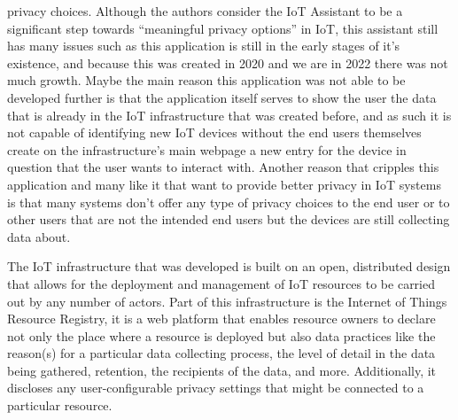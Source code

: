 \documentclass[conference]{IEEEtran}
\begin{document}
privacy choices. Although the authors consider the IoT Assistant to be a significant
step towards ``meaningful privacy options'' in IoT, this assistant still has many
issues such as this application is still in the early stages of it's existence,
and because this was created in 2020 and we are in 2022 there was not much growth.
Maybe the main reason this application was not able to be developed further is
that the application itself serves to show the user the data that is already in
the IoT infrastructure that was created before, and as such it is not capable of
identifying new IoT devices without the end users themselves create on the
infrastructure's main webpage \cite{DasPersonalized} a new entry for the device
in question that the user wants to interact with. Another reason that cripples this
application and many like it that want to provide better privacy in IoT systems is
that many systems don't offer any type of privacy choices to the end user or to
other users that are not the intended end users but the devices are still collecting
data about.

The IoT infrastructure that was developed \cite{DasPersonalized} is built on an open,
distributed design that allows for the deployment and management of IoT resources
to be carried out by any number of actors. Part of this infrastructure is the
Internet of Things Resource Registry, it is a web platform that enables resource
owners to declare not only the place where a resource is deployed but also data
practices like the reason(s) for a particular data collecting process, the level of
detail in the data being gathered, retention, the recipients of the data, and more.
Additionally, it discloses any user-configurable privacy settings that might be
connected to a particular resource.
\end{document}
